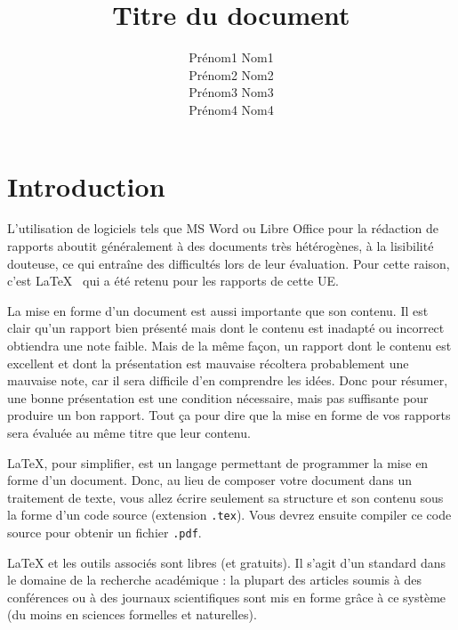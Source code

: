 \documentclass{ceri/sty/rapport}
\title{Titre du document}
\author{
	Prénom1 Nom1 \\ %
	Prénom2 Nom2 \\
	Prénom3 Nom3 \\
	Prénom4 Nom4
}
\begin{document}
 

\maketitle

\sloppy      








\section{Introduction}
\label{sec:Introduction}
L'utilisation de logiciels tels que MS Word ou Libre Office pour la rédaction de rapports aboutit généralement à des documents très hétérogènes, à la lisibilité douteuse, ce qui entraîne des difficultés lors de leur évaluation. Pour cette raison, c'est \LaTeX{}~\cite{LaTeXProject2010, Wikipedia2011a} qui a été retenu pour les rapports de cette UE.

La mise en forme d'un document est aussi importante que son contenu. Il est clair qu'un rapport bien présenté mais dont le contenu est inadapté ou incorrect obtiendra une note faible. Mais de la même façon, un rapport dont le contenu est excellent et dont la présentation est mauvaise récoltera probablement une mauvaise note, car il sera difficile d'en comprendre les idées. Donc pour résumer, une bonne présentation est une condition nécessaire, mais pas suffisante pour produire un bon rapport. Tout ça pour dire que la mise en forme de vos rapports sera évaluée au même titre que leur contenu.
	
\LaTeX{}, pour simplifier, est un langage permettant de programmer la mise en forme d'un document. Donc, au lieu de composer votre document dans un traitement de texte, vous allez écrire seulement sa structure et son contenu sous la forme d'un code source (extension \texttt{.tex}). Vous devrez ensuite compiler ce code source pour obtenir un fichier \texttt{.pdf}.
	
\LaTeX{} et les outils associés sont libres (et gratuits). Il s'agit d'un standard dans le domaine de la recherche académique : la plupart des articles soumis à des conférences ou à des journaux scientifiques sont mis en forme gr\^ace à ce système (du moins en sciences formelles et naturelles).
	
\end{document}
